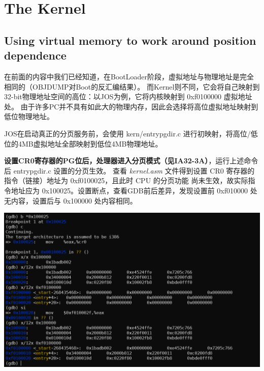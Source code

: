 \documentclass[12pt, letterpaper]{report}
\begin{document}
\chapter[\Large The Kernel]{The Kernel}
\section[\large Using virtual memory to work around position dependence]{Using virtual memory to work around position dependence}
在前面的内容中我们已经知道，在BootLoader阶段，虚拟地址与物理地址是完全相同的（OBJDUMP对Boot的反汇编结果）。
而Kernel则不同，它会将自己映射到32-bit物理地址空间的高位：以JOS为例，它将内核映射到 0xf0100000 虚拟地址处。
由于许多PC并不具有如此大的物理内存，因此会选择将高位虚拟地址映射到低位物理地址。 \par 
JOS在启动真正的分页服务前，会使用 kern/entrypgdir.c 进行初映射，将高位/低位的4MB虚拟地址全部映射到低位4MB物理地址。
\quad \par 

\textbf{设置CR0寄存器的PG位后，处理器进入分页模式（见IA32-3A）}，运行上述命令后 entrypgdir.c 设置的分页生效。
查看 \textsl{kernel.asm} 文件得到设置 CR0 寄存器的指令（链接）地址为 0xf0100025，且此时 CPU 的分页功能
尚未生效，故实际指令地址应为 0x100025。设置断点，查看GDB前后差异，发现设置前 0xf010000 处无内容，设置后与 0x100000 
处内容相同。 \par
\quad \par
\includegraphics[width=\textwidth]{entrypgdir_start} \par
\end{document}
